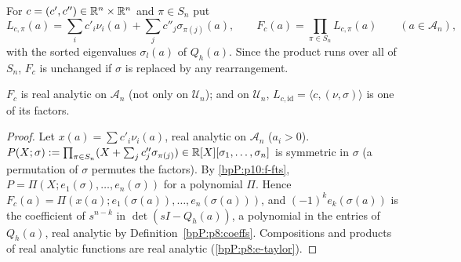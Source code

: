\begin{definition}\label{bpP:p10:Fc-def}
For $c=(c',c'')\in\mathbb{R}^n\times\mathbb{R}^n$ and $\pi\in S_n$ put
\[L_{c,\pi}(a)=\sum_ic'_i\nu_i(a)+\sum_jc''_j\sigma_{\pi(j)}(a),\qquad F_c(a)=\prod_{\pi\in S_n}L_{c,\pi}(a)\qquad(a\in\mathcal A_n),\]
with the sorted eigenvalues $\sigma_l(a)$ of $Q_h(a)$. Since the product runs over all of $S_n$, $F_c$ is unchanged if $\sigma$ is replaced by any rearrangement.
\end{definition}

\begin{proposition}\label{bpP:p10:Fc-analytic}
$F_c$ is real analytic on $\mathcal A_n$ (not only on $\mathcal U_n$); and on $\mathcal U_n$, $L_{c,\mathrm{id}}=\langle c,(\nu,\sigma)\rangle$ is one of its factors.
\end{proposition}
\begin{proof}
\label{stepP:p10:Fc-poly} Let $x(a)=\sum c'_i\nu_i(a)$, real analytic on $\mathcal A_n$ ($a_i>0$). $P(X;\sigma):=\prod_{\pi\in S_n}(X+\sum_jc''_j\sigma_{\pi(j)})\in\mathbb{R}[X][\sigma_1,\dots,\sigma_n]$ is symmetric in $\sigma$ (a permutation of $\sigma$ permutes the factors). By \ref{bpP:p10:f-fts}, $P=\Pi(X;e_1(\sigma),\dots,e_n(\sigma))$ for a polynomial $\Pi$. Hence $F_c(a)=\Pi(x(a);e_1(\sigma(a)),\dots,e_n(\sigma(a)))$, and $(-1)^ke_k(\sigma(a))$ is the coefficient of $s^{n-k}$ in $\det(sI-Q_h(a))$, a polynomial in the entries of $Q_h(a)$, real analytic by Definition~\ref{bpP:p8:coeffs}. Compositions and products of real analytic functions are real analytic (\ref{bpP:p8:e-taylor}).
\end{proof}

